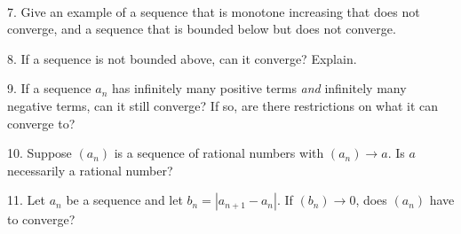 \documentclass{article}
\begin{document}
~\\

7. Give an example of a sequence that is monotone increasing that does not converge, and a sequence that is bounded below but does not converge.

8. If a sequence is not bounded above, can it converge? Explain.

9. If a sequence $a_n$ has infinitely many positive terms \textit{and} infinitely many negative terms, can it still converge? If so, are there restrictions on what it can converge to?

10. Suppose $(a_n)$ is a sequence of rational numbers with $(a_n) \to a$. Is $a$ necessarily a rational number?

11. Let $a_n$ be a sequence and let $b_n = \left| a_{n + 1} - a_n \right|$. If $(b_n) \to 0$, does $(a_n)$ have to converge?
\end{document}
